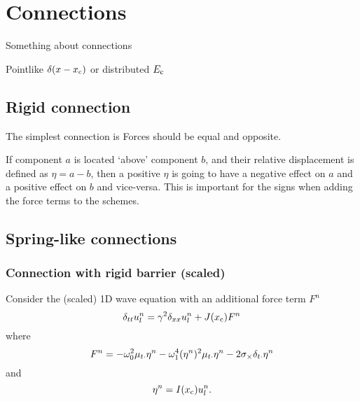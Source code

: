 \chapter{Connections}\label{ch:connections}
Something about connections

Pointlike $\delta(x-x_{\text{c}})$ or distributed $E_{\text{c}}$

\section{Rigid connection}
The simplest connection is Forces should be equal and opposite. 

If component $a$ is located `above' component $b$, and their relative displacement is defined as $\eta = a-b$, then a positive $\eta$ is going to have a negative effect on $a$ and a positive effect on $b$ and vice-versa. This is important for the signs when adding the force terms to the schemes. 

\section{Spring-like connections}

\subsection{Connection with rigid barrier (scaled)}
Consider the (scaled) 1D wave equation with an additional force term $F^n$
\begin{equation}\label{eq:1DwaveConnRigid}
    \delta_{tt} u_l^n = \gamma^2\delta_{xx} u_l^n + J(x_{\text{c}})F^n
\end{equation}
where
\begin{equation}\label{eq:1DwaveConnRigidForce}
    F^n = -\omega_0^2\mu_{t\cdot}\eta^n - \omega_1^4(\eta^n)^2\mu_{t\cdot}\eta^n - 2\sigma_\times \delta_{t\cdot} \eta^n
\end{equation}
and
\begin{equation}\label{eq:etaRigid}
    \eta^n = I(x_{\text{c}})u_l^n.
\end{equation}

